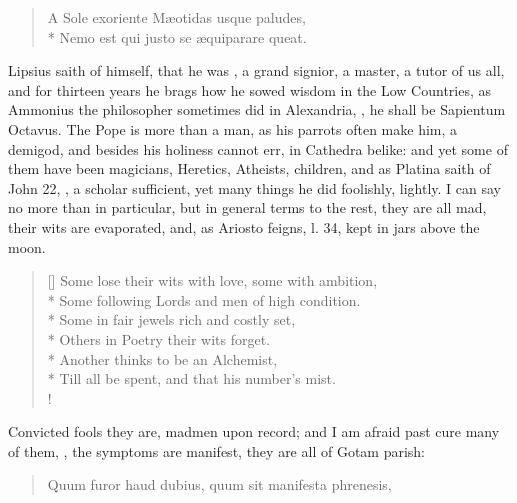{\begin{verse}
\textlatin{A Sole exoriente M\ae{}otidas usque paludes,}\\*
\textlatin{Nemo est qui justo se \ae{}quiparare queat.}
\end{verse}

Lipsius saith of himself, that he was , a grand signior, a master, a tutor of us all,
and for thirteen years he brags how he sowed wisdom in the Low
Countries, as Ammonius the philosopher sometimes did in Alexandria,
, he shall be Sapientum Octavus. The Pope is more than a man,
as his parrots often make him, a demigod, and besides his holiness
cannot err, in Cathedra belike: and yet some of them have been
magicians, Heretics, Atheists, children, and as Platina saith of John
22, , a scholar sufficient,
yet many things he did foolishly, lightly. I can say no more than in
particular, but in general terms to the rest, they are all mad, their
wits are evaporated, and, as Ariosto feigns, l. 34, kept in jars above
the moon.

\settowidth{\versewidth}{Till all be spent, and that his number's mist.}
\begin{verse}[\versewidth]
Some lose their wits with love, some with ambition,\\*
Some following Lords and men of high condition.\\*
Some in fair jewels rich and costly set,\\*
Others in Poetry their wits forget.\\*
Another thinks to be an Alchemist,\\*
Till all be spent, and that his number's mist.\\!
\end{verse}

Convicted fools they are, madmen upon record; and I am afraid past cure
many of them, , the symptoms are manifest, they are
all of Gotam parish:

\begin{quote}
\textlatin{Quum furor haud dubius, quum sit manifesta phrenesis,}
\end{quote}

}
